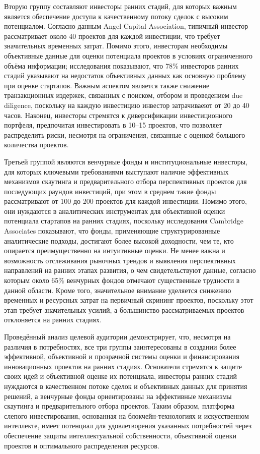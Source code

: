 \documentclass[
    14pt,
    specialist,
    candidate, %
    subf, %
    href,
    times,
    dotsinheaders=false,
    colorlinks=false
]{disser}
\begin{document}
Вторую группу составляют инвесторы ранних стадий, для которых важным является обеспечение доступа к качественному потоку сделок с высоким потенциалом. Согласно данным Angel Capital Association, типичный инвестор рассматривает около 40 проектов для каждой инвестиции, что требует значительных временных затрат. Помимо этого, инвесторам необходимы объективные данные для оценки потенциала проектов в условиях ограниченного объёма информации; исследования показывают, что 78\% инвесторов ранних стадий указывают на недостаток объективных данных как основную проблему при оценке стартапов. Важным аспектом является также снижение транзакционных издержек, связанных с поиском, отбором и проведением due diligence, поскольку на каждую инвестицию инвестор затрачиваеют от 20 до 40 часов. Наконец, инвесторы стремятся к диверсификации инвестиционного портфеля, предпочитая инвестировать в 10–15 проектов, что позволяет распределить риски, несмотря на ограничения, связанные с оценкой большого количества проектов.

Третьей группой являются венчурные фонды и институциональные инвесторы, для которых ключевыми требованиями выступают наличие эффективных механизмов скаутинга и предварительного отбора перспективных проектов для последующих раундов инвестиций, при этом в среднем такие фонды рассматривают от 100 до 200 проектов для каждой инвестиции. Помимо этого, они нуждаются в аналитических инструментах для объективной оценки потенциала стартапов на ранних стадиях, поскольку исследования Cambridge Associates показывают, что фонды, применяющие структурированные аналитические подходы, достигают более высокой доходности, чем те, кто опирается преимущественно на интуитивные оценки. Не менее важна и возможность отслеживания рыночных трендов и выявления перспективных направлений на ранних этапах развития, о чем свидетельствуют данные, согласно которым около 65\% венчурных фондов отмечают существенные трудности в данной области. Кроме того, значительное внимание уделяется снижению временных и ресурсных затрат на первичный скрининг проектов, поскольку этот этап требует значительных усилий, а большинство рассматриваемых проектов отклоняется на ранних стадиях.

Проведённый анализ целевой аудитории демонстрирует, что, несмотря на различия в потребностях, все три группы заинтересованы в создании более эффективной, объективной и прозрачной системы оценки и финансирования инновационных проектов на ранних стадиях. Основатели стремятся к защите своих идей и объективной оценке их потенциала, инвесторы ранних стадий нуждаются в качественном потоке сделок и объективных данных для принятия решений, а венчурные фонды ориентированы на эффективные механизмы скаутинга и предварительного отбора проектов. Таким образом, платформа слепого инвестирования, основанная на блокчейн-технологиях и искусственном интеллекте, имеет потенциал для удовлетворения указанных потребностей через обеспечение защиты интеллектуальной собственности, объективной оценки проектов и оптимального распределения ресурсов.
\end{document}
